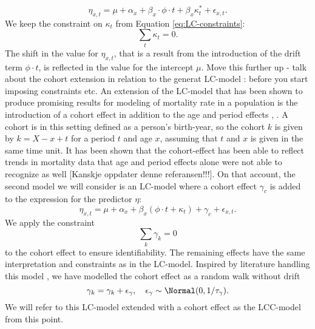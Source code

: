 \begin{equation}
\eta_{x,t} = \mu + \alpha_x + \beta_x\cdot\phi\cdot t + \beta_x\kappa_t^* + \epsilon_{x,t}.
\end{equation}
We keep the constraint on $\kappa_t$ from Equation \ref{eq:LC-constraints}:
\begin{equation*}
    \sum_t \kappa_t = 0.
\end{equation*}
The shift in the value for $\eta_{x,t}$, that is a result from the introduction of the drift term $\phi \cdot t$, is reflected in the value for the intercept $\mu$. 
\newline
\textcolor{myDarkGreen}{Move this further up - talk about the cohort extension in relation to the generat LC-model : before you start imposing constraints etc. }
An extension of the LC-model that has been shown to produce promising results for modeling of mortality rate in a population is the introduction of a cohort effect in addition to the age and period effects \cite{booth_tickle_2008}, \cite{Wisniowski2015}. A cohort is in this setting defined as a person's birth-year, so the cohort $k$ is given by $k = X - x + t$ for a period $t$ and age $x$, assuming that $t$ and $x$ is given in the same time unit. It has been shown that the cohort-effect has been able to reflect trends in mortality data that age and period effects alone were not able to recognize as well \cite{Wisniowski2015}[Kanskje oppdater denne referansen!!!]. On that account, the second model we will consider is an LC-model where a cohort effect $\gamma_c$ is added to the expression for the predictor $\eta$:
\begin{equation}
    \eta_{x,t} = \mu + \alpha_x + \beta_x(\phi \cdot t + \kappa_t) + \gamma_c + \epsilon_{x,t}.
    \label{eq:LCC-model}
\end{equation}
We apply the constraint 
\begin{equation}
    \sum_k \gamma_k = 0
    \label{eq:cohort-constraint}
\end{equation}
to the cohort effect to ensure identifiability. The remaining effects have the same interpretation and constraints as in the LC-model. Inspired by literature handling this model \cite{Wisniowski2015}, we have modelled the cohort effect as a random walk without drift
\begin{equation}
    \gamma_k = \gamma_k + \epsilon_\gamma, \quad \epsilon_\gamma \sim \Normal(0, 1/\tau_\gamma).
    \label{eq:cohort-rw}
\end{equation}
We will refer to this LC-model extended with a cohort effect as the LCC-model from this point.
